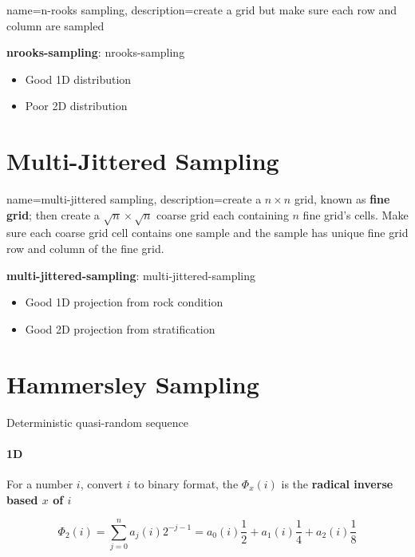   {
    name=n-rooks sampling,
    description={create a grid but make sure each row and column are sampled}
  }

  \textbf{\Gls{nrooks-sampling}}: \glsdesc{nrooks-sampling}

  \begin{itemize}
    \item Good 1D distribution
    \item Poor 2D distribution
  \end{itemize}

\section{Multi-Jittered Sampling}

  {
    name=multi-jittered sampling,
    description={create a $ n \times n $ grid, known as \textbf{fine grid};
    then create a $ \sqrt{n} \times \sqrt{n} $ coarse grid each
    containing $ n $ fine grid's cells.
    Make sure each coarse grid cell contains one sample
    and the sample has unique fine grid row and column of the fine grid.}
  }

  \textbf{\Gls{multi-jittered-sampling}}: \glsdesc{multi-jittered-sampling}

  \begin{itemize}
    \item Good 1D projection from rock condition
    \item Good 2D projection from stratification
  \end{itemize}

\section{Hammersley Sampling}

  Deterministic quasi-random sequence

  \paragraph{1D} For a number $ i $, convert $ i $ to binary format, the
  $ \Phi_{x} \left( i \right) $ is the \textbf{radical inverse based $ x $ of $ i $}

  \begin{equation}
    \Phi_{2}\left( i \right)
      = \sum_{j = 0}^{n} a_{j} \left( i \right) 2^{-j - 1}
      = a_{0} \left( i \right) \frac{1}{2}
      + a_{1} \left( i \right) \frac{1}{4}
      + a_{2} \left( i \right) \frac{1}{8}
  \end{equation}

